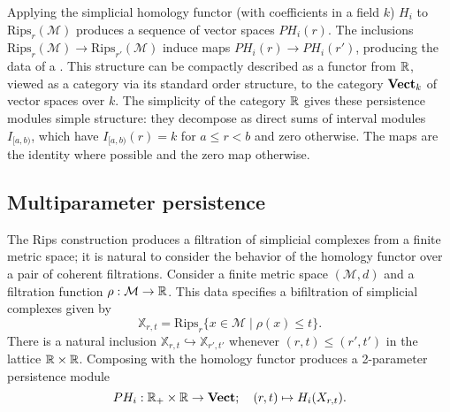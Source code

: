 \documentclass{article}
\begin{document}
Applying the simplicial homology functor (with coefficients in a field $k$)
$H_i$ to $\text{Rips}_r(\mathcal M)$ produces a sequence of vector spaces
$PH_i(r)$. The inclusions $\text{Rips}_r(\mathcal M) \to
\text{Rips}_{r'}(\mathcal M)$ induce maps $PH_i(r) \to PH_i(r')$, producing the
data of a . This structure can be compactly
described as a functor from $\mathbb{R}$, viewed as a category via its standard order
structure, to the category $\operatorname{\mathbf{Vect}}_k$ of vector spaces over $k$. The simplicity
of the category $\mathbb{R}$ gives these persistence modules simple structure: they
decompose as direct sums of interval modules $I_{[a,b)}$, which have
$I_{[a,b)}(r) = k$ for $a \leq r < b$ and zero otherwise. The maps are the
identity where possible and the zero map otherwise.


\subsection{Multiparameter persistence}
The Rips construction produces a filtration of simplicial complexes from a
finite metric space; it is natural to consider the behavior of the homology
functor over a pair of coherent filtrations. Consider
a finite metric space $(\mathcal M, d)$ and a filtration
function $\rho:\mathcal M \to \mathbb{R}$. This data specifies a bifiltration of
simplicial complexes given by
\[\mathbb{X}_{r,t} = \text{Rips}_r\{x \in \mathcal M \mid \rho(x) \leq t\}.\]
There is a natural inclusion $\mathbb{X}_{r,t} \hookrightarrow
\mathbb{X}_{r',t'}$ whenever $(r,t) \leq (r',t')$ in the lattice $\mathbb{R} \times \mathbb{R}$.
Composing with the homology functor produces a 2-parameter persistence module
\[PH_{i}: \mathbb{R}_+ \times \mathbb{R} \to \operatorname{\mathbf{Vect}}; \quad (r,t) \mapsto H_i(X_{r,t}).\]

\end{document}
